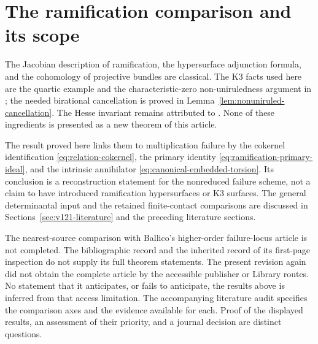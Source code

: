 \section{The ramification comparison and its scope}
\label{sec:v122-literature}
The Jacobian description of ramification, the hypersurface
adjunction formula, and the cohomology of projective bundles are
classical. The K3 facts used here are the quartic example and the
characteristic-zero non-uniruledness argument in
\cite[Chapter 1, Example 1.3(i); Chapter 9, proof of Corollary 4.4]{HuyK3};
the needed birational cancellation is proved in
Lemma~\ref{lem:nonuniruled-cancellation}. The Hesse invariant remains
attributed to \cite{AD09}. None of these ingredients is presented
as a new theorem of this article.

The result proved here links them to multiplication failure by the
cokernel identification \eqref{eq:relation-cokernel}, the primary
identity \eqref{eq:ramification-primary-ideal}, and the intrinsic
annihilator \eqref{eq:canonical-embedded-torsion}. Its conclusion
is a reconstruction statement for the nonreduced failure scheme,
not a claim to have introduced ramification hypersurfaces or K3
surfaces. The general determinantal input and the retained
finite-contact comparisons are discussed in
Sections~\ref{sec:v121-literature} and the preceding literature sections.

The nearest-source comparison with Ballico's higher-order failure-locus
article \cite{Ballico93} is not completed. The bibliographic record
and the inherited record of its first-page inspection do not supply
its full theorem statements. The present revision again did not obtain
the complete article by the accessible publisher or Library routes.
No statement that it anticipates, or fails to anticipate, the results
above is inferred from that access limitation. The accompanying
literature audit specifies the comparison axes and the evidence
available for each. Proof of the displayed results, an assessment of
their priority, and a journal decision are distinct questions.
